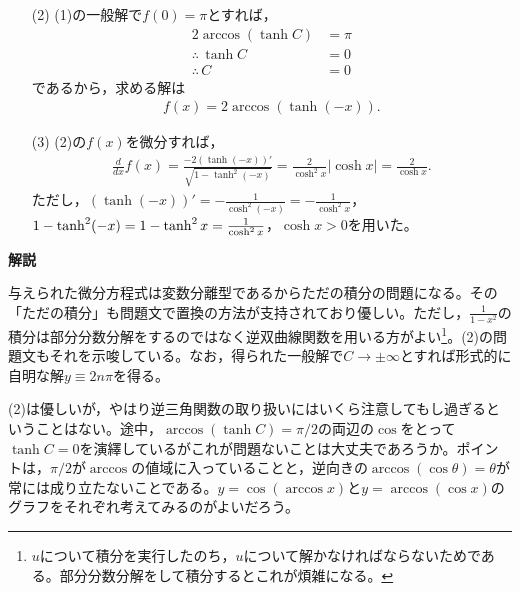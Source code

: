 \documentclass[a4paper,12pt,dvipdfmx,fleqn, oneside]{jsarticle}
\theoremstyle{defstyle}
\theoremstyle{thmx}
\theoremstyle{qesstyle}
\begin{document}
\begin{screen}
    \begin{enumerate}
        \item[(2)] (1)の一般解で$f(0)=\pi$とすれば，
            \begin{align*}
                2\arccos(\tanh C)     & = \pi \\
                \therefore \, \tanh C & =0    \\
                \therefore \, C       & = 0
            \end{align*}
            であるから，求める解は
            \begin{align*}
                f(x)=2\arccos(\tanh (-x)).
            \end{align*}
        \item[(3)] (2)の$f(x)$を微分すれば，
            \begin{align*}
                \frac{d}{dx} f(x) = \frac{-2(\tanh (-x))'}{\sqrt{1-\tanh^2 (-x)}} = \frac{2}{\cosh^2 x} |\cosh x| = \frac{2}{\cosh x}.
            \end{align*}
            ただし，$(\tanh(-x))'=-\frac{1}{\cosh^2 (-x)}=-\frac{1}{\cosh^2 x}$，$1-\tanh^2(-x)=\\1-\tanh^2 x = \frac{1}{\cosh^2 x} $，$\cosh x >0$を用いた。
    \end{enumerate}
\end{screen}

\textbf{解説}

与えられた微分方程式は変数分離型であるからただの積分の問題になる。その「ただの積分」も問題文で置換の方法が支持されており優しい。ただし，$\frac{1}{1-x^2}$の積分は部分分数分解をするのではなく逆双曲線関数を用いる方がよい\footnote{$u$について積分を実行したのち，$u$について解かなければならないためである。部分分数分解をして積分するとこれが煩雑になる。}。(2)の問題文もそれを示唆している。なお，得られた一般解で$C \to \pm \infty $とすれば形式的に自明な解$y\equiv 2n \pi$を得る。

(2)は優しいが，やはり逆三角関数の取り扱いにはいくら注意してもし過ぎるということはない。途中，$\arccos(\tanh C)=\pi /2$の両辺の$\cos$をとって$\tanh C=0$を演繹しているがこれが問題ないことは大丈夫であろうか。ポイントは，$\pi /2$が$\arccos$の値域に入っていることと，逆向きの$\arccos (\cos \theta) = \theta$が常には成り立たないことである。$y=\cos (\arccos x)$と$y = \arccos (\cos x)$のグラフをそれぞれ考えてみるのがよいだろう。
\end{document}
